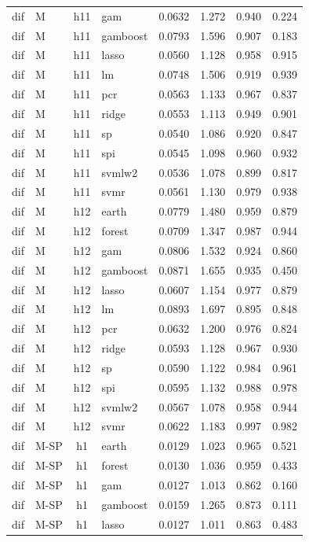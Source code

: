 \begin{ThreePartTable}
\begin{longtable}[t]{llclcccc}
dif & M & h11 & gam & 0.0632 & 1.272 & 0.940 & 0.224\\
dif & M & h11 & gamboost & 0.0793 & 1.596 & 0.907 & 0.183\\
dif & M & h11 & lasso & 0.0560 & 1.128 & 0.958 & 0.915\\
dif & M & h11 & lm & 0.0748 & 1.506 & 0.919 & 0.939\\
dif & M & h11 & pcr & 0.0563 & 1.133 & 0.967 & 0.837\\
dif & M & h11 & ridge & 0.0553 & 1.113 & 0.949 & 0.901\\
dif & M & h11 & sp & 0.0540 & 1.086 & 0.920 & 0.847\\
dif & M & h11 & spi & 0.0545 & 1.098 & 0.960 & 0.932\\
dif & M & h11 & svmlw2 & 0.0536 & 1.078 & 0.899 & 0.817\\
dif & M & h11 & svmr & 0.0561 & 1.130 & 0.979 & 0.938\\
\addlinespace
dif & M & h12 & earth & 0.0779 & 1.480 & 0.959 & 0.879\\
dif & M & h12 & forest & 0.0709 & 1.347 & 0.987 & 0.944\\
dif & M & h12 & gam & 0.0806 & 1.532 & 0.924 & 0.860\\
dif & M & h12 & gamboost & 0.0871 & 1.655 & 0.935 & 0.450\\
dif & M & h12 & lasso & 0.0607 & 1.154 & 0.977 & 0.879\\
dif & M & h12 & lm & 0.0893 & 1.697 & 0.895 & 0.848\\
dif & M & h12 & pcr & 0.0632 & 1.200 & 0.976 & 0.824\\
dif & M & h12 & ridge & 0.0593 & 1.128 & 0.967 & 0.930\\
dif & M & h12 & sp & 0.0590 & 1.122 & 0.984 & 0.961\\
dif & M & h12 & spi & 0.0595 & 1.132 & 0.988 & 0.978\\
dif & M & h12 & svmlw2 & 0.0567 & 1.078 & 0.958 & 0.944\\
dif & M & h12 & svmr & 0.0622 & 1.183 & 0.997 & 0.982\\
\addlinespace
dif & M-SP & h1 & earth & 0.0129 & 1.023 & 0.965 & 0.521\\
dif & M-SP & h1 & forest & 0.0130 & 1.036 & 0.959 & 0.433\\
dif & M-SP & h1 & gam & 0.0127 & 1.013 & 0.862 & 0.160\\
dif & M-SP & h1 & gamboost & 0.0159 & 1.265 & 0.873 & 0.111\\
dif & M-SP & h1 & lasso & 0.0127 & 1.011 & 0.863 & 0.483\\

\end{longtable}
\end{ThreePartTable}
